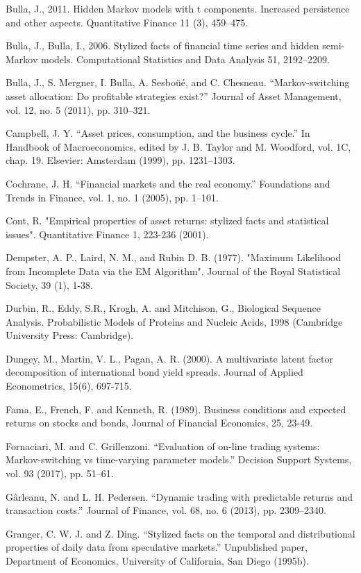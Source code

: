 Bulla, J., 2011. Hidden Markov models with t components. Increased persistence and other aspects. Quantitative Finance 11 (3), 459–475.

Bulla, J., Bulla, I., 2006. Stylized facts of financial time series and hidden semi- Markov models. Computational Statistics and Data Analysis 51, 2192–2209.

Bulla, J., S. Mergner, I. Bulla, A. Sesboüé, and C. Chesneau. “Markov-switching asset allocation: Do profitable strategies exist?” Journal of Asset Management, vol. 12, no. 5 (2011), pp. 310–321.

Campbell, J. Y. “Asset prices, consumption, and the business cycle.” In Handbook of Macroeconomics, edited by J. B. Taylor and M. Woodford, vol. 1C, chap. 19. Elsevier: Amsterdam (1999), pp. 1231–1303.

Cochrane, J. H. “Financial markets and the real economy.” Foundations and Trends in Finance, vol. 1, no. 1 (2005), pp. 1–101.

Cont, R. "Empirical properties of asset returns: stylized facts and statistical issues". Quantitative Finance 1, 223-236 (2001).

Dempster, A. P., Laird, N. M., and Rubin D. B. (1977). "Maximum Likelihood from Incomplete Data via the EM Algorithm". Journal of the Royal Statistical Society, 39 (1), 1-38.

Durbin, R., Eddy, S.R., Krogh, A. and Mitchison, G., Biological
Sequence Analysis. Probabilistic Models of Proteins and Nucleic
Acids, 1998 (Cambridge University Press: Cambridge).

Dungey, M., Martin, V. L., Pagan, A. R. (2000). A multivariate latent factor decomposition of international bond yield spreads. Journal of Applied Econometrics, 15(6), 697-715.

Fama, E., French, F. and Kenneth, R. (1989). Business conditions and expected returns on stocks and bonds, Journal of Financial Economics, 25, 23-49.

Fornaciari, M. and C. Grillenzoni. “Evaluation of on-line trading systems: Markov-switching vs time-varying parameter models.” Decision Support Systems, vol. 93 (2017), pp. 51–61.

Gârleanu, N. and L. H. Pedersen. “Dynamic trading with predictable returns and
transaction costs.” Journal of Finance, vol. 68, no. 6 (2013), pp. 2309–2340.

Granger, C. W. J. and Z. Ding. “Stylized facts on the temporal and distributional properties of daily data from speculative markets.” Unpublished paper, Department of Economics, University of California, San Diego (1995b).

